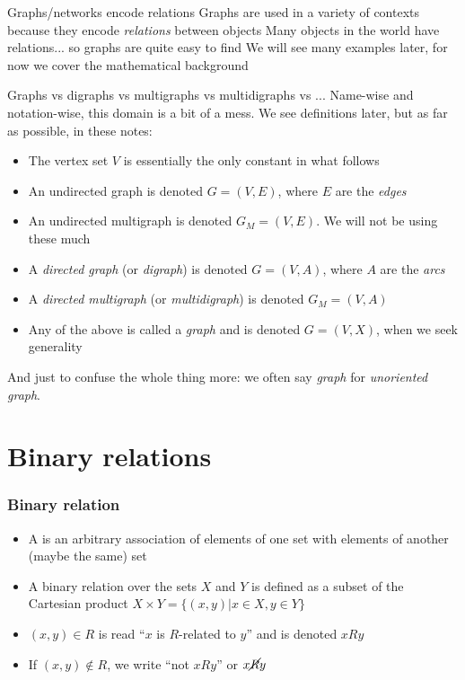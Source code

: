 \documentclass[aspectratio=43]{beamer}
\begin{document}
\begin{frame}{Graphs/networks encode relations}
	Graphs are used in a variety of contexts because they encode \emph{relations} between objects
	\vfill
	Many objects in the world have relations... so graphs are quite easy to find
	\vfill
	We will see many examples later, for now we cover the mathematical background
\end{frame}



\begin{frame}{Graphs vs digraphs vs multigraphs vs multidigraphs vs ...}
	Name-wise and notation-wise, this domain is a bit of a mess. We see definitions later, but as far as possible, in these notes:
	\begin{itemize}
		\item The vertex set $V$ is essentially the only constant in what follows
		\item An undirected graph is denoted $G=(V,E)$, where $E$ are the \emph{edges}
		\item An undirected multigraph is denoted $G_M=(V,E)$. We will not be using these much
		\item A \emph{directed graph} (or \emph{digraph}) is denoted $G=(V,A)$, where $A$ are the \emph{arcs}
		\item A \emph{directed multigraph} (or \emph{multidigraph}) is denoted $G_M=(V,A)$
		\item Any of the above is called a \emph{graph} and is denoted $G=(V,X)$, when we seek generality
	\end{itemize}
And just to confuse the whole thing more: we often say \emph{graph} for \emph{unoriented graph}.
\end{frame}

\section{Binary relations}

\begin{frame}\frametitle{Binary relation}
	\begin{definition}
	\begin{itemize}
	\item A  is an arbitrary association of elements of one set with elements of another (maybe the same) set
	\item  A binary relation over the sets $X$ and $Y$ is defined as a subset of the Cartesian product $X\times Y =\{(x,y)| x\in X , y\in Y\}$
	\item $(x,y)\in R$ is read ``$x$ is $R$-related to $y$'' and is denoted $xRy$
	\item If $(x,y)\not\in R$, we write ``not $x R y$'' or $x\cancel{R} y$
	\end{itemize}
	\end{definition}
\end{frame}
	
\end{document}
